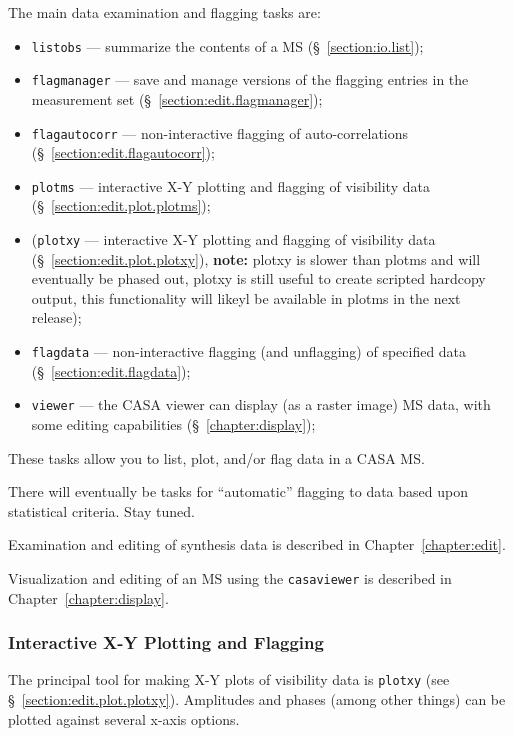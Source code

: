 The main data examination and flagging tasks are:
\begin{itemize}
   \item {\tt listobs} --- summarize the contents of a MS 
         (\S~\ref{section:io.list});
   \item {\tt flagmanager} --- save and manage versions of the
         flagging entries in the measurement set
         (\S~\ref{section:edit.flagmanager});
   \item {\tt flagautocorr} --- non-interactive flagging of
         auto-correlations (\S~\ref{section:edit.flagautocorr});
   \item {\tt plotms} --- interactive X-Y plotting and flagging of
         visibility data (\S~\ref{section:edit.plot.plotms});
   \item ({\tt plotxy} --- interactive X-Y plotting and flagging of
         visibility data (\S~\ref{section:edit.plot.plotxy}), {\bf
           note:} plotxy is slower than plotms and will eventually be
         phased out, plotxy is still useful to create scripted
         hardcopy output, this functionality will likeyl be available
         in plotms in the next release);
   \item {\tt flagdata} --- non-interactive flagging (and unflagging)
         of specified data (\S~\ref{section:edit.flagdata});
   \item {\tt viewer} --- the CASA viewer can display (as a raster
         image) MS data, with some editing capabilities 
         (\S~\ref{chapter:display});
\end{itemize}

These tasks allow you to list, plot, and/or flag data in a CASA MS.

There will eventually be tasks for ``automatic'' flagging to
data based upon statistical criteria.  Stay tuned.

Examination and editing of synthesis data is described in
Chapter~\ref{chapter:edit}.

Visualization and editing of an MS using the {\tt casaviewer}
is described in Chapter~\ref{chapter:display}.

\subsubsection{Interactive X-Y Plotting and Flagging}
\label{section:intro.walkthru.flag.plotxy}

The principal tool for making X-Y plots of visibility data is
{\tt plotxy} (see \S~\ref{section:edit.plot.plotxy}).  Amplitudes and phases
(among other things) can be plotted against several x-axis options.

